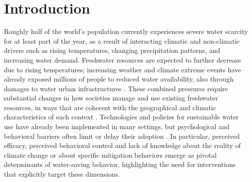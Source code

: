 \documentclass[preprint,12pt]{elsarticle}
\begin{document}


\section{Introduction}
\label{sec1}
Roughly half of the world's population currently experiences severe water scarcity for at least part of the year, as a result of interacting climatic and non‑climatic drivers such as rising temperatures, changing precipitation patterns, and increasing water demand. Freshwater resources are expected to further decrease due to rising temperatures; increasing weather and climate extreme events have already exposed millions of people to reduced water availability, also through damages to water urban infrastructures \cite{IPCC}. These combined pressures require substantial changes in how societies manage and use existing freshwater resources, in ways that are coherent with the geographical and climatic characteristics of each context \cite{bagliani2019cambiamento}.
Technologies and policies for sustainable water use have already been implemented in many settings, but psychological and behavioral barriers often limit or delay their adoption \cite{gifford2011behavioral, sanchez2023barriers}. In particular, perceived efficacy, perceived behavioral control and lack of knowledge about the reality of climate change or about specific mitigation behaviors emerge as pivotal determinants of water‑saving behavior, highlighting the need for interventions that explicitly target these dimensions.
\end{document}
